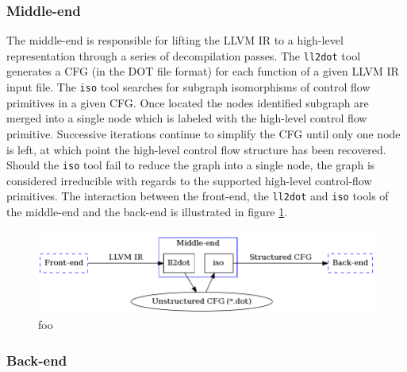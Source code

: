\documentclass[12pt, a4paper]{article}
\begin{document}
\subsubsection{Middle-end}



The middle-end is responsible for lifting the LLVM IR to a high-level representation through a series of decompilation passes. The \texttt{ll2dot} tool generates a CFG (in the DOT file format) for each function of a given LLVM IR input file. The \texttt{iso} tool searches for subgraph isomorphisms of control flow primitives in a given CFG. Once located the nodes identified subgraph are merged into a single node which is labeled with the high-level control flow primitive. Successive iterations continue to simplify the CFG until only one node is left, at which point the high-level control flow structure has been recovered. Should the \texttt{iso} tool fail to reduce the graph into a single node, the graph is considered irreducible with regards to the supported high-level control-flow primitives. The interaction between the front-end, the \texttt{ll2dot} and \texttt{iso} tools of the middle-end and the back-end is illustrated in figure \ref{middle_end}.

\begin{figure}[htbp]
	\begin{center}
		\includegraphics[width=\textwidth]{inc/middle-end.png}
		\caption{foo}
		\label{middle_end}
	\end{center}
\end{figure}

\subsubsection{Back-end}



\end{document}
